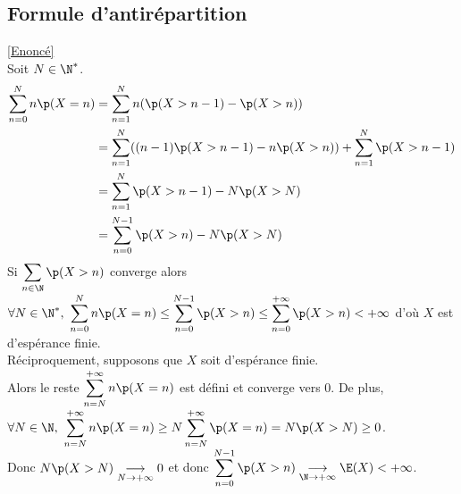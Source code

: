 \documentclass[8pt]{book}
\begin{document}
	\subsection{Formule d'antirépartition }
	\label{Formule d'antirépartition corrigé}
		\textcolor{blue}{\hyperref[Formule d'antirépartition]{[Enoncé]}}\\
	Soit $N\in \N^*$.
	\begin{align*}
		\sum\limits_{n=0}^{N}n\p(X=n)&=\sum\limits_{n=1}^{N}n(\p(X>n-1)-\p(X>n))\\
		&=\sum\limits_{n=1}^{N}((n-1)\p(X>n-1)-n\p(X>n))+\sum\limits_{n=1}^{N}\p(X>n-1)\\
		&=\sum\limits_{n=1}^{N}\p(X>n-1)-N\p(X>N)\\
		&=\sum\limits_{n=0}^{N-1}\p(X>n)-N\p(X>N)\\
	\end{align*}
	Si $\displaystyle\sum\limits_{n\in \N}\p(X>n)$ converge alors $\forall N\in \N^*,\ \displaystyle\sum\limits_{n=0}^{N}n\p(X=n)\leq \displaystyle\sum\limits_{n=0}^{N-1}\p(X>n)\leq \sum\limits_{n=0}^{+\infty}\p(X>n)<+\infty$ d'où $X$ est d'espérance finie.\\
	Réciproquement, supposons que $X$ soit d'espérance finie.\\
	Alors le reste $\displaystyle\sum\limits_{n=N}^{+\infty}n\p(X=n)$ est défini et converge vers $0$. De plus,\\
	$\forall N\in \N,\ \displaystyle\sum\limits_{n=N}^{+\infty}n\p(X=n)\geq N\displaystyle\sum\limits_{n=N}^{+\infty}\p(X=n)=N\p(X>N)\geq 0$.\\
	Donc $N\p(X>N)\underset{N\to +\infty}{\longrightarrow}0$ et donc $\displaystyle\sum\limits_{n=0}^{N-1}\p(X>n)\underset{\N\to +\infty}{\longrightarrow}\E(X)<+\infty$.
	
\end{document}
